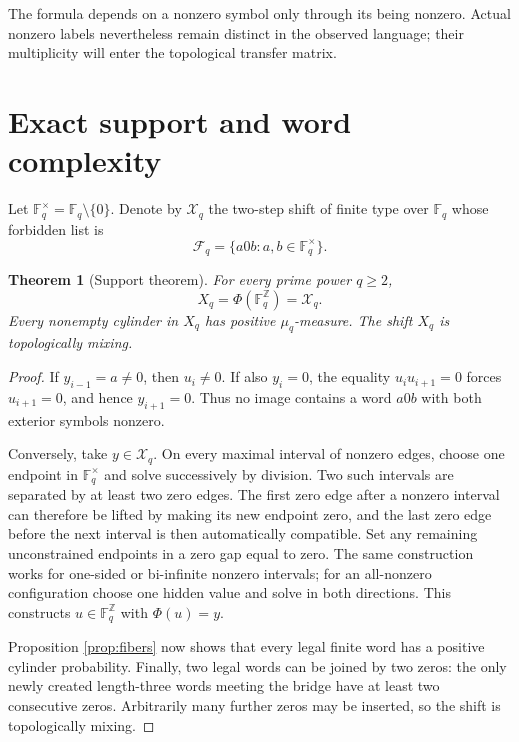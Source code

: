 \documentclass[11pt,a4paper]{amsart}
\newtheorem{theorem}{Theorem}[section]
\theoremstyle{definition}
\theoremstyle{remark}
\newcommand{\F}{\mathbb F}
\newcommand{\Z}{\mathbb Z}
\newcommand{\cX}{\mathcal X}
\begin{document}
The formula depends on a nonzero symbol only through its being nonzero.
Actual nonzero labels nevertheless remain distinct in the observed
language; their multiplicity will enter the topological transfer matrix.

\section{Exact support and word complexity}
\label{sec:support}

Let $\F_q^\times=\F_q\setminus\{0\}$.  Denote by $\cX_q$ the two-step shift
of finite type over $\F_q$ whose forbidden list is
\begin{equation}\label{eq:forbidden}
 \mathcal F_q=\{a0b:a,b\in\F_q^\times\}.
\end{equation}

\begin{theorem}[Support theorem]\label{thm:support}
For every prime power $q\geq2$,
\[
 X_q=\Phi(\F_q^\Z)=\cX_q.
\]
Every nonempty cylinder in $X_q$ has positive $\mu_q$-measure.  The shift
$X_q$ is topologically mixing.
\end{theorem}

\begin{proof}
If $y_{i-1}=a\ne0$, then $u_i\ne0$.  If also $y_i=0$, the equality
$u_i u_{i+1}=0$ forces $u_{i+1}=0$, and hence $y_{i+1}=0$.  Thus no image
contains a word $a0b$ with both exterior symbols nonzero.

Conversely, take $y\in\cX_q$.  On every maximal interval of nonzero edges,
choose one endpoint in $\F_q^\times$ and solve successively by division.
Two such intervals are separated by at least two zero edges.  The first
zero edge after a nonzero interval can therefore be lifted by making its new
endpoint zero, and the last zero edge before the next interval is then
automatically compatible.  Set any remaining unconstrained endpoints in a
zero gap equal to zero.  The same construction works for one-sided or
bi-infinite nonzero intervals; for an all-nonzero configuration choose one
hidden value and solve in both directions.  This constructs
$u\in\F_q^\Z$ with $\Phi(u)=y$.

Proposition \ref{prop:fibers} now shows that every legal finite word has a
positive cylinder probability.  Finally, two legal words can be joined by
two zeros: the only newly created length-three words meeting the bridge have
at least two consecutive zeros.  Arbitrarily many further zeros may be
inserted, so the shift is topologically mixing.
\end{proof}
\end{document}
